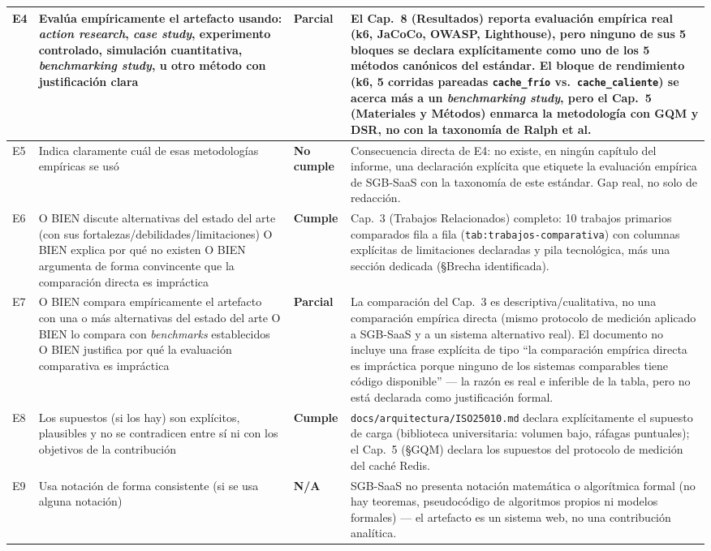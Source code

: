 \begin{center}
\begin{longtable}{|p{0.7cm}|p{4.2cm}|p{1.6cm}|p{7.0cm}|}
\hline
E4 & Evalúa empíricamente el artefacto usando: \emph{action research}, \emph{case study}, experimento controlado, simulación cuantitativa, \emph{benchmarking study}, u otro método con justificación clara & \textbf{Parcial} & El Cap.\ 8 (Resultados) reporta evaluación empírica real (k6, JaCoCo, OWASP, Lighthouse), pero ninguno de sus 5 bloques se declara explícitamente como uno de los 5 métodos canónicos del estándar. El bloque de rendimiento (k6, 5 corridas pareadas \texttt{cache\_frío} vs.\ \texttt{cache\_caliente}) se acerca más a un \emph{benchmarking study}, pero el Cap.\ 5 (Materiales y Métodos) enmarca la metodología con GQM y DSR, no con la taxonomía de Ralph et al. \\
\hline
E5 & Indica claramente cuál de esas metodologías empíricas se usó & \textbf{No cumple} & Consecuencia directa de E4: no existe, en ningún capítulo del informe, una declaración explícita que etiquete la evaluación empírica de SGB-SaaS con la taxonomía de este estándar. Gap real, no solo de redacción. \\
\hline
E6 & O BIEN discute alternativas del estado del arte (con sus fortalezas/\allowbreak debilidades/\allowbreak limitaciones) O BIEN explica por qué no existen O BIEN argumenta de forma convincente que la comparación directa es impráctica & \textbf{Cumple} & Cap.\ 3 (Trabajos Relacionados) completo: 10 trabajos primarios comparados fila a fila (\texttt{tab:trabajos-comparativa}) con columnas explícitas de limitaciones declaradas y pila tecnológica, más una sección dedicada (§Brecha identificada). \\
\hline
E7 & O BIEN compara empíricamente el artefacto con una o más alternativas del estado del arte O BIEN lo compara con \emph{benchmarks} establecidos O BIEN justifica por qué la evaluación comparativa es impráctica & \textbf{Parcial} & La comparación del Cap.\ 3 es descriptiva/cualitativa, no una comparación empírica directa (mismo protocolo de medición aplicado a SGB-SaaS y a un sistema alternativo real). El documento no incluye una frase explícita de tipo ``la comparación empírica directa es impráctica porque ninguno de los sistemas comparables tiene código disponible'' --- la razón es real e inferible de la tabla, pero no está declarada como justificación formal. \\
\hline
E8 & Los supuestos (si los hay) son explícitos, plausibles y no se contradicen entre sí ni con los objetivos de la contribución & \textbf{Cumple} & \texttt{docs/arquitectura/ISO25010.md} declara explícitamente el supuesto de carga (biblioteca universitaria: volumen bajo, ráfagas puntuales); el Cap.\ 5 (§GQM) declara los supuestos del protocolo de medición del caché Redis. \\
\hline
E9 & Usa notación de forma consistente (si se usa alguna notación) & \textbf{N/A} & SGB-SaaS no presenta notación matemática o algorítmica formal (no hay teoremas, pseudocódigo de algoritmos propios ni modelos formales) --- el artefacto es un sistema web, no una contribución analítica. \\
\hline
\end{longtable}
\end{center}

